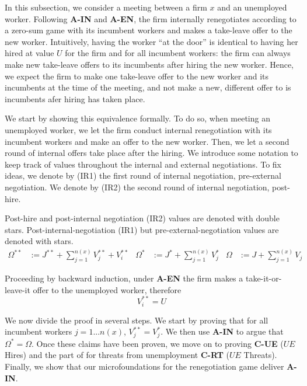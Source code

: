 In this subsection, we consider a meeting between a firm $x$ and an
unemployed worker. Following \textbf{A-IN} and \textbf{A-EN}, the firm internally renegotiates according to a zero-sum game with its incumbent workers and makes a take-leave offer  to the new worker. Intuitively, having the
worker ``at the door'' is identical to having her hired at value $U$ for the
firm and for all incumbent workers: the firm can always make new take-leave
offers to its incumbents after hiring the new worker. Hence, we expect the
firm to make one take-leave offer to the new worker and its incumbents at
the time of the meeting, and not make a new, different offer to is
incumbents afer hiring has taken place.

We start by showing this equivalence formally. To do so, when meeting an
unemployed worker, we let the firm conduct internal renegotiation with its
incumbent workers and make an offer to the new worker. Then, we let a
second round of internal offers take place after the hiring. We introduce
some notation to keep track of values throughout the internal and external
negotiations. To fix ideas, we denote by (IR1) the first round of internal
negotiation, pre-external negotiation. We denote by (IR2) the second round
of internal negotiation, post-hire.

Post-hire and post-internal negotiation (IR2) values are denoted with double
stars. Post-internal-negotiation (IR1) but pre-external-negotiation values
are denoted with stars.
\begin{align*}
\Omega^{\ast\ast} &
:=J^{\ast\ast}+\sum_{j=1}^{n(x)}V_{j}^{\ast\ast}+V_{i}^{\ast\ast} &
\Omega^{\ast} & :=J^{\ast}+\sum_{j=1}^{n(x)}V_{j}^{\ast} &
\Omega & :=J+\sum_{j=1}^{n\left(x\right)}V_{j}
\end{align*}

Proceeding by backward induction, under \textbf{A-EN} the firm makes a
take-it-or-leave-it offer to the unemployed worker, therefore
\begin{equation*}
V_{i}^{\ast\ast}=U
\end{equation*}

We now divide the proof in several steps. We start by proving that for all incumbent workers $j=1...n(x)$, $V_{j}^{\ast\ast}=V_{j}^{\ast}$. We then use \textbf{A-IN} to argue that $\Omega^* = \Omega$. Once these claims have been proven, we move on
to proving \textbf{C-UE} ($UE$ Hires) and the part of for threats from
unemployment \textbf{C-RT} ($UE$ Threats). Finally, we show that our microfoundations for the renegotiation game deliver \textbf{A-IN}.

